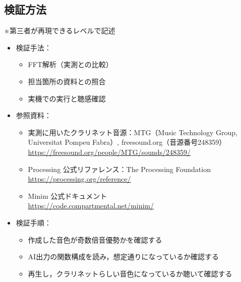 \documentclass[uplatex,dvipdfmx]{jlreq}
\begin{document}
\subsection{検証方法}
※第三者が再現できるレベルで記述
\begin{itemize}
  \item 検証手法：
  \begin{itemize}
    \item FFT解析（実測との比較）
    \item 担当箇所の資料との照合
    \item 実機での実行と聴感確認
  \end{itemize}
  \item 参照資料：
  \begin{itemize}
    \item 実測に用いたクラリネット音源：MTG（Music Technology Group, Universitat Pompeu Fabra）, freesound.org（音源番号248359）\\
          \url{https://freesound.org/people/MTG/sounds/248359/}
    \item Processing 公式リファレンス：The Processing Foundation\\
          \url{https://processing.org/reference/}
    \item Minim 公式ドキュメント\\
          \url{https://code.compartmental.net/minim/}
  \end{itemize}
  \item 検証手順：
  \begin{itemize}
    \item 作成した音色が奇数倍音優勢かを確認する
    \item AI出力の関数構成を読み，想定通りになっているか確認する
    \item 再生し，クラリネットらしい音色になっているか聴いて確認する
  \end{itemize}
\end{itemize}
\end{document}
